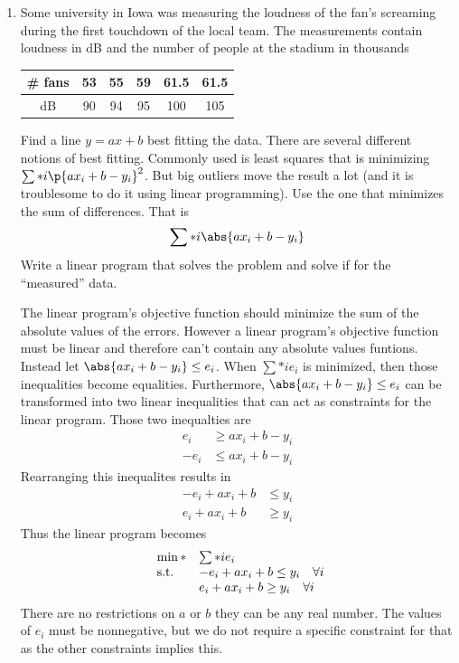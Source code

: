 \documentclass[11pt, oneside]{article}
\begin{document}
\begin{enumerate}
    \item %
        Some university in Iowa was measuring the loudness of the fan's
        screaming during the first touchdown of the local team.
        The measurements contain loudness in dB and the number of people at the
        stadium in thousands
        \begin{center}
            \begin{tabular}{*{6}c}
                \toprule
                \# fans & 53 & 55 & 59 & 61.5 & 61.5 \\
                \midrule
                dB     & 90 & 94 & 95 &  100 &  105 \\
                \bottomrule
            \end{tabular}
        \end{center}
        Find a line $y = ax + b$ best fitting the data.
        There are several different notions of best fitting.
        Commonly used is least squares that is minimizing $\sum*{i}{}{\p{ax_i + b - y_i}^2}$.
        But big outliers move the result a lot (and it is troublesome to do it
        using linear programming).
        Use the one that minimizes the sum of differences. That is
        \[
            \sum*{i}{}{\abs{a x_i + b - y_i}}
        \]
        Write a linear program that solves the problem and solve if for the
        ``measured'' data.

        The linear program's objective function should minimize the sum of the
        absolute values of the errors.
        However a linear program's objective function must be linear and
        therefore can't contain any absolute values funtions.
        Instead let $\abs{a x_i + b - y_i} \le e_i$.
        When $\sum*{i}{}{e_i}$ is minimized, then those inequalities become
        equalities.
        Furthermore, $\abs{a x_i + b - y_i} \le e_i$ can be transformed into two
        linear inequalities that can act as constraints for the linear program.
        Those two inequalties are
        \begin{align*}
             e_i &\ge a x_i + b - y_i \\
            -e_i &\le a x_i + b - y_i
        \end{align*}
        Rearranging this inequalites results in
        \begin{align*}
            -e_i + a x_i + b &\le y_i \\
             e_i + a x_i + b &\ge y_i
        \end{align*}
        Thus the linear program becomes
        \[
            \begin{array}{ll@{}ll}
                \min* & \sum*{i}{}{e_i} \\
                \text{s.t.} & -e_i + a x_i + b \le y_i \quad \forall i \\
                            &  e_i + a x_i + b \ge y_i \quad \forall i
            \end{array}
        \]
        There are no restrictions on $a$ or $b$ they can be any real number.
        The values of $e_i$ must be nonnegative, but we do not require a
        specific constraint for that as the other constraints implies this.


\end{enumerate}
\end{document}
